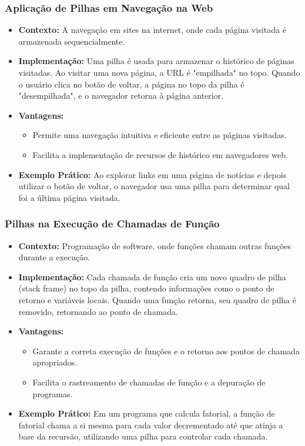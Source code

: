 \begin{frame}[fragile]
  \frametitle{Aplicação de Pilhas em Navegação na Web}
  \begin{itemize}
    \item \textbf{Contexto:} A navegação em sites na internet, onde cada página visitada é armazenada sequencialmente.
    \item \textbf{Implementação:} Uma pilha é usada para armazenar o histórico de páginas visitadas. Ao visitar uma nova página, a URL é "empilhada" no topo. Quando o usuário clica no botão de voltar, a página no topo da pilha é "desempilhada", e o navegador retorna à página anterior.
    \item \textbf{Vantagens:}
      \begin{itemize}
        \item Permite uma navegação intuitiva e eficiente entre as páginas visitadas.
        \item Facilita a implementação de recursos de histórico em navegadores web.
      \end{itemize}
    \item \textbf{Exemplo Prático:} Ao explorar links em uma página de notícias e depois utilizar o botão de voltar, o navegador usa uma pilha para determinar qual foi a última página visitada.
  \end{itemize}
\end{frame}

\begin{frame}[fragile]
  \frametitle{Pilhas na Execução de Chamadas de Função}
  \begin{itemize}
    \item \textbf{Contexto:} Programação de software, onde funções chamam outras funções durante a execução.
    \item \textbf{Implementação:} Cada chamada de função cria um novo quadro de pilha (stack frame) no topo da pilha, contendo informações como o ponto de retorno e variáveis locais. Quando uma função retorna, seu quadro de pilha é removido, retornando ao ponto de chamada.
    \item \textbf{Vantagens:}
      \begin{itemize}
        \item Garante a correta execução de funções e o retorno aos pontos de chamada apropriados.
        \item Facilita o rastreamento de chamadas de função e a depuração de programas.
      \end{itemize}
    \item \textbf{Exemplo Prático:} Em um programa que calcula fatorial, a função de fatorial chama a si mesma para cada valor decrementado até que atinja a base da recursão, utilizando uma pilha para controlar cada chamada.
  \end{itemize}
\end{frame}

